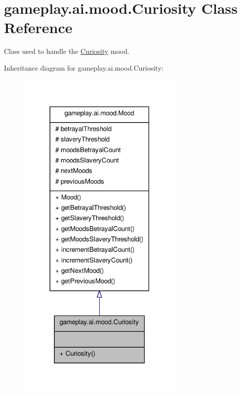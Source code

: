 \hypertarget{classgameplay_1_1ai_1_1mood_1_1_curiosity}{\section{gameplay.\-ai.\-mood.\-Curiosity Class Reference}
\label{classgameplay_1_1ai_1_1mood_1_1_curiosity}
}


Class used to handle the \hyperlink{classgameplay_1_1ai_1_1mood_1_1_curiosity}{Curiosity} mood.  




Inheritance diagram for gameplay.\-ai.\-mood.\-Curiosity\-:
\nopagebreak
\begin{figure}[H]
\begin{center}
\leavevmode
\includegraphics[width=230pt]{classgameplay_1_1ai_1_1mood_1_1_curiosity__inherit__graph}
\end{center}
\end{figure}


